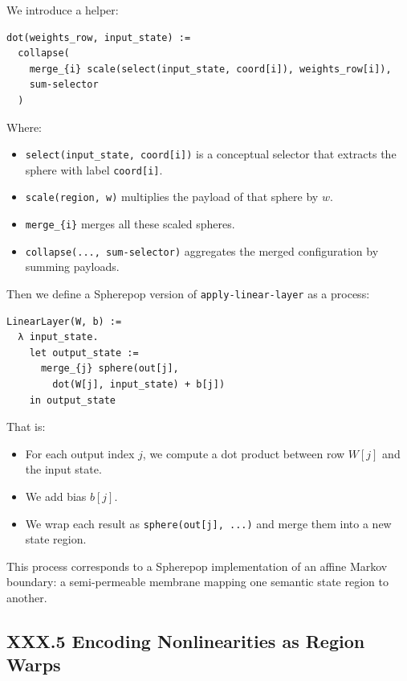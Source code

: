 \documentclass[11pt,letterpaper]{article}
\begin{document}
We introduce a helper:

\begin{verbatim}
dot(weights_row, input_state) :=
  collapse(
    merge_{i} scale(select(input_state, coord[i]), weights_row[i]),
    sum-selector
  )
\end{verbatim}

Where:

\begin{itemize}
  \item \verb|select(input_state, coord[i])| is a conceptual selector that extracts the sphere with label \verb|coord[i]|.
  \item \verb|scale(region, w)| multiplies the payload of that sphere by $w$.
  \item \verb|merge_{i}| merges all these scaled spheres.
  \item \verb|collapse(..., sum-selector)| aggregates the merged configuration by summing payloads.
\end{itemize}

Then we define a Spherepop version of \texttt{apply-linear-layer} as a process:

\begin{verbatim}
LinearLayer(W, b) :=
  λ input_state.
    let output_state :=
      merge_{j} sphere(out[j],
        dot(W[j], input_state) + b[j])
    in output_state
\end{verbatim}

That is:

\begin{itemize}
  \item For each output index $j$, we compute a dot product between row $W[j]$ and the input state.
  \item We add bias $b[j]$.
  \item We wrap each result as \verb|sphere(out[j], ...)| and merge them into a new state region.
\end{itemize}

This process corresponds to a Spherepop implementation of an affine Markov boundary: a semi-permeable membrane mapping one semantic state region to another.

\subsection{XXX.5 Encoding Nonlinearities as Region Warps}
\end{document}
